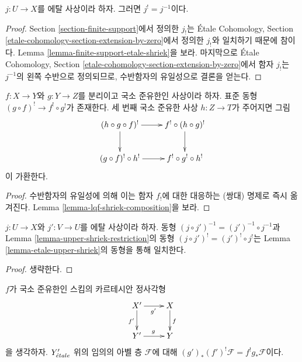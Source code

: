 \begin{lemma}
\label{lemma-etale-upper-shriek}
$j : U \to X$를 에탈 사상이라 하자. 그러면 $j^! = j^{-1}$이다.
\end{lemma}

\begin{proof}
Section \ref{section-finite-support}에서 정의한 $j_!$는
\'Etale Cohomology, Section
\ref{etale-cohomology-section-extension-by-zero}에서 정의한 $j_!$와
일치하기 때문에 참이다. Lemma
\ref{lemma-finite-support-etale-shriek}을 보라. 마지막으로
\'Etale Cohomology, Section
\ref{etale-cohomology-section-extension-by-zero}에서 함자 $j_!$는
$j^{-1}$의 왼쪽 수반으로 정의되므로, 수반함자의 유일성으로 결론을
얻는다.
\end{proof}

\begin{lemma}
\label{lemma-upper-shriek-restriction}
$f : X \to Y$와 $g : Y \to Z$를 분리이고 국소 준유한인 사상이라
하자. 표준 동형 $(g \circ f)^! \to f^! \circ g^!$가 존재한다.
세 번째 국소 준유한 사상 $h : Z \to T$가 주어지면 그림
$$
\xymatrix{
(h \circ g \circ f)^! \ar[r] \ar[d] &
f^! \circ (h \circ g)^! \ar[d] \\
(g \circ f)^! \circ h^! \ar[r] & f^! \circ g^! \circ h^!
}
$$
이 가환한다.
\end{lemma}

\begin{proof}
수반함자의 유일성에 의해 이는 함자 $f_!$에 대한 대응하는 (쌍대)
명제로 즉시 옮겨진다. Lemma
\ref{lemma-lqf-shriek-composition}을 보라.
\end{proof}

\begin{lemma}
\label{lemma-upper-shriek-restriction-etale}
$j : U \to X$와 $j' : V \to U$를 에탈 사상이라 하자. 동형
$(j \circ j')^{-1} = (j')^{-1} \circ j^{-1}$과 Lemma
\ref{lemma-upper-shriek-restriction}의 동형
$(j \circ j')^! = (j')^! \circ j^!$는 Lemma
\ref{lemma-etale-upper-shriek}의 동형을 통해 일치한다.
\end{lemma}

\begin{proof}
생략한다.
\end{proof}

\begin{lemma}
\label{lemma-lqf-base-change-upper-shriek}
$f$가 국소 준유한인 스킴의 카르테시안 정사각형
$$
\xymatrix{
X' \ar[r]_{g'} \ar[d]_{f'} & X \ar[d]^f \\
Y' \ar[r]^g & Y
}
$$
을 생각하자. $Y'_{\acute{e}tale}$ 위의 임의의 아벨 층 $\mathcal{F}$에 대해
$(g')_*(f')^!\mathcal{F} = f^!g_*\mathcal{F}$이다.
\end{lemma}

